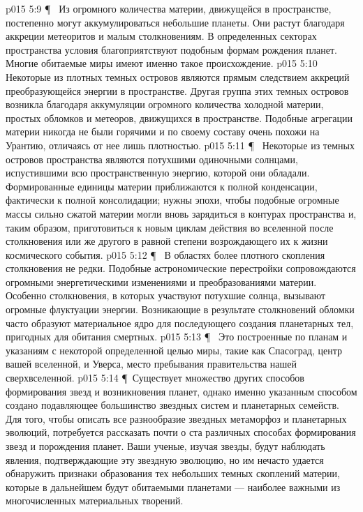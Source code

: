 \vs p015 5:9 \P\ \bibnobreakspace {} Из огромного количества материи, движущейся в пространстве, постепенно могут аккумулироваться небольшие планеты. Они растут благодаря аккреции метеоритов и малым столкновениям. В определенных секторах пространства условия благоприятствуют подобным формам рождения планет. Многие обитаемые миры имеют именно такое происхождение.
\vs p015 5:10 Некоторые из плотных темных островов являются прямым следствием аккреций преобразующейся энергии в пространстве. Другая группа этих темных островов возникла благодаря аккумуляции огромного количества холодной материи, простых обломков и метеоров, движущихся в пространстве. Подобные агрегации материи никогда не были горячими и по своему составу очень похожи на Урантию, отличаясь от нее лишь плотностью.
\vs p015 5:11 \P\ \bibnobreakspace {} Некоторые из темных островов пространства являются потухшими одиночными солнцами, испустившими всю пространственную энергию, которой они обладали. Формированные единицы материи приближаются к полной конденсации, фактически к полной консолидации; нужны эпохи, чтобы подобные огромные массы сильно сжатой материи могли вновь зарядиться в контурах пространства и, таким образом, приготовиться к новым циклам действия во вселенной после столкновения или же другого в равной степени возрождающего их к жизни космического события.
\vs p015 5:12 \P\ \bibnobreakspace {} В областях более плотного скопления столкновения не редки. Подобные астрономические перестройки сопровождаются огромными энергетическими изменениями и преобразованиями материи. Особенно столкновения, в которых участвуют потухшие солнца, вызывают огромные флуктуации энергии. Возникающие в результате столкновений обломки часто образуют материальное ядро для последующего создания планетарных тел, пригодных для обитания смертных.
\vs p015 5:13 \P\ \bibnobreakspace {} Это построенные по планам и указаниям с некоторой определенной целью миры, такие как Спасоград, центр вашей вселенной, и Уверса, место пребывания правительства нашей сверхвселенной.
\vs p015 5:14 \P\ Существует множество других способов формирования звезд и возникновения планет, однако именно указанным способом создано подавляющее большинство звездных систем и планетарных семейств. Для того, чтобы описать все разнообразие звездных метаморфоз и планетарных эволюций, потребуется рассказать почти о ста различных способах формирования звезд и порождения планет. Ваши ученые, изучая звезды, будут наблюдать явления, подтверждающие эту звездную эволюцию, но им нечасто удается обнаружить признаки образования тех небольших темных скоплений материи, которые в дальнейшем будут обитаемыми планетами --- наиболее важными из многочисленных материальных творений.
